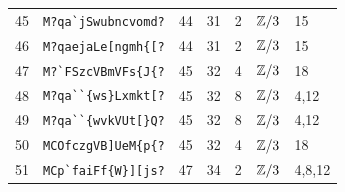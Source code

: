 \begin{longtable}{rlrrrrl}
45 & \verb+M?qa`jSwubncvomd?+ & 44 & 31 & 2 & $\mathbb Z/3$ & 15 \\
46 & \verb+M?qaejaLe[ngmh{[?+ & 44 & 31 & 2 & $\mathbb Z/3$ & 15 \\
47 & \verb+M?`FSzcVBmVFs{J{?+ & 45 & 32 & 4 & $\mathbb Z/3$ & 18 \\
48 & \verb+M?qa``{ws}Lxmkt[?+ & 45 & 32 & 8 & $\mathbb Z/3$ & 4,12 \\
49 & \verb+M?qa``{wvkVUt[}Q?+ & 45 & 32 & 8 & $\mathbb Z/3$ & 4,12 \\
50 & \verb+MCOfczgVB]UeM{p{?+ & 45 & 32 & 4 & $\mathbb Z/3$ & 18 \\
51 & \verb+MCp`faiFf{W}][js?+ & 47 & 34 & 2 & $\mathbb Z/3$ & 4,8,12 \\
\end{longtable}\endgroup
